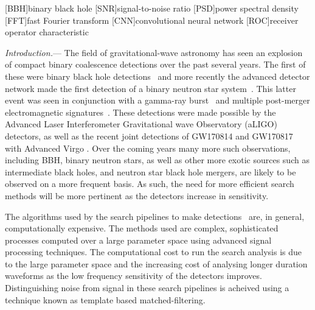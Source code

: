 \documentclass[%
showpacs,
 amsmath,amssymb,
 aps,
 twocolumn,
 prl,
 reprint,
floatfix,
]{revtex4-1}
\begin{document}
\maketitle

[BBH]{binary black hole}
[SNR]{signal-to-noise ratio}
[PSD]{power spectral density}
[FFT]{fast Fourier transform}
[CNN]{convolutional neural network}
[ROC]{receiver operator characteristic}


%
%

%
%
\textit{Introduction.}--- 
%
%
The field of gravitational-wave astronomy has seen an explosion of compact
binary coalescence detections over the past several years. The first of these
were binary black hole detections~\cite{PhysRevLett.116.061102,
PhysRevLett.116.241103, PhysRevLett.118.221101} and more recently the advanced
detector network made the first detection of a binary neutron star
system~\cite{PhysRevLett.119.161101}. This latter event was seen in conjunction
with a gamma-ray
burst~\cite{2017arXiv171005834L,2017arXiv171005446G,2017arXiv171005449S} and
multiple post-merger electromagnetic signatures~\cite{2017arXiv171005833L}.
These detections were made possible by the Advanced Laser Interferometer
Gravitational wave Observatory (aLIGO) detectors, as well as the recent joint
detections of GW170814 and GW170817 with Advanced Virgo
\cite{PhysRevLett.119.141101,PhysRevLett.119.161101}. Over the coming years
many more such observations, including \ac{BBH}, binary neutron stars, as well
as other more exotic sources such as intermediate black holes, and neutron star
black hole mergers, are likely to be observed on a more frequent basis. As
such, the need for more efficient search methods will be more pertinent as the
detectors increase in sensitivity.

%
%
The algorithms used by the search pipelines to make
detections~\cite{0264-9381-33-21-215004, 0004-637X-748-2-136,
PhysRevD.90.082004} are, in general, computationally expensive. The methods
used are complex, sophisticated processes computed over a large parameter space
using advanced signal processing techniques. The computational cost to run the
search analysis is due to the large parameter space and the increasing cost of
analysing longer duration waveforms as the low frequency sensitivity of the
detectors improves. Distinguishing noise from signal in these search pipelines
is acheived using a technique known as template based matched-filtering. 
\end{document}
